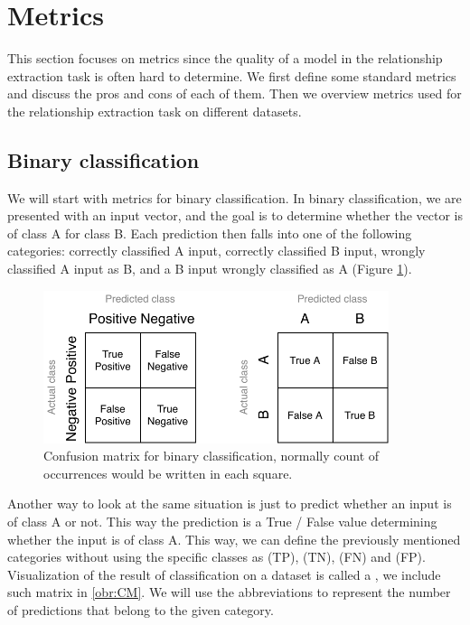 \section{Metrics}
This section focuses on metrics since the quality of a model in the relationship extraction task is often hard to determine. We first define some standard metrics and discuss the pros and cons of each of them. Then we overview metrics used for the relationship extraction task on different datasets.

\subsection{Binary classification}

We will start with metrics for binary classification. In binary classification, we are presented with an input vector, and the goal is to determine whether the vector is of class A for class B. Each prediction then falls into one of the following categories: correctly classified A input, correctly classified B input, wrongly classified A input as B, and a B input wrongly classified as A (Figure \ref{obr:CM}). 

\begin{figure}[h]\centering
\includegraphics[width=0.9\textwidth]{./img//Diplomka diagramy-Confusion matric}
\caption{Confusion matrix for binary classification, normally count of occurrences would be written in each square. }
\label{obr:CM}
\end{figure}

Another way to look at the same situation is just to predict whether an input is of class A or not. This way the prediction is a True / False value determining whether the input is of class A. This way, we can define the previously mentioned categories without using the specific classes as  (TP),  (TN),  (FN) and  (FP). Visualization of the result of classification on a dataset is called a , we include such matrix in \autoref{obr:CM}. We will use the abbreviations to represent the number of predictions that belong to the given category.  



